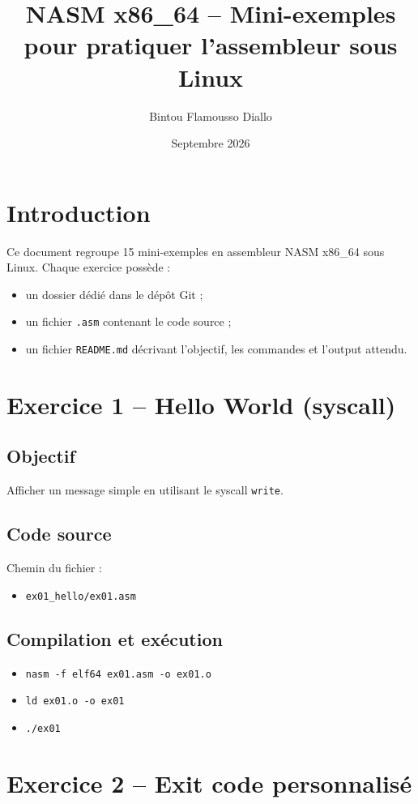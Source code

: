 \documentclass[11pt]{article}
\title{NASM x86\_64 -- Mini-exemples pour pratiquer l'assembleur sous Linux}
\author{Bintou Flamousso Diallo}
\date{Septembre 2026}
\begin{document}
\maketitle
\tableofcontents
\newpage

\section*{Introduction}
Ce document regroupe 15 mini-exemples en assembleur NASM x86\_64 sous Linux.
Chaque exercice possède :
\begin{itemize}[noitemsep]
    \item un dossier dédié dans le dépôt Git ;
    \item un fichier \texttt{.asm} contenant le code source ;
    \item un fichier \texttt{README.md} décrivant l'objectif, les commandes et l'output attendu.
\end{itemize}

\section{Exercice 1 -- Hello World (syscall)}
\subsection*{Objectif}
Afficher un message simple en utilisant le syscall \texttt{write}.

\subsection*{Code source}
Chemin du fichier :
\begin{itemize}[noitemsep]
    \item \texttt{ex01\_hello/ex01.asm}
\end{itemize}

\subsection*{Compilation et exécution}
\begin{itemize}[noitemsep]
    \item \texttt{nasm -f elf64 ex01.asm -o ex01.o}
    \item \texttt{ld ex01.o -o ex01}
    \item \texttt{./ex01}
\end{itemize}

\section{Exercice 2 -- Exit code personnalisé}
\end{document}
